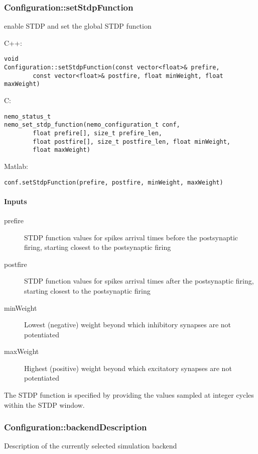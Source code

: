 \subsubsection*{Configuration::setStdpFunction}
\label{fn: setStdpFunction}
enable STDP and set the global STDP function


\noindent C++:
\begin{lstlisting}[aboveskip=2pt]
void
Configuration::setStdpFunction(const vector<float>& prefire, 
        const vector<float>& postfire, float minWeight, float maxWeight)
\end{lstlisting}

\noindent C:
\begin{lstlisting}[aboveskip=2pt]
nemo_status_t
nemo_set_stdp_function(nemo_configuration_t conf, 
        float prefire[], size_t prefire_len, 
        float postfire[], size_t postfire_len, float minWeight, 
        float maxWeight)
\end{lstlisting}

\noindent Matlab:
\begin{lstlisting}[aboveskip=2pt]
conf.setStdpFunction(prefire, postfire, minWeight, maxWeight)
\end{lstlisting}
\paragraph{Inputs}
\begin{description}
\item[prefire] STDP function values for spikes arrival times before the postsynaptic firing, starting closest to the postsynaptic firing
\item[postfire] STDP function values for spikes arrival times after the postsynaptic firing, starting closest to the postsynaptic firing
\item[minWeight] Lowest (negative) weight beyond which inhibitory synapses are not potentiated
\item[maxWeight] Highest (positive) weight beyond which excitatory synapses are not potentiated
\end{description}
The STDP function is specified by providing the values sampled at integer cycles within the STDP window.

\clearpage
\subsubsection*{Configuration::backendDescription}
\label{fn: backendDescription}
Description of the currently selected simulation backend


